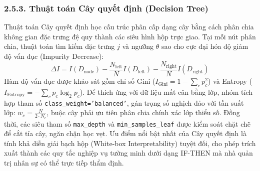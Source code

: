 \documentclass[12pt,a4paper]{article}
\begin{document}
\subsubsection{2.5.3. Thuật toán Cây quyết định (Decision Tree)}
Thuật toán Cây quyết định học cấu trúc phân cấp dạng cây bằng cách phân chia không gian đặc trưng đệ quy thành các siêu hình hộp trực giao. Tại mỗi nút phân chia, thuật toán tìm kiếm đặc trưng $j$ và ngưỡng $\theta$ sao cho cực đại hóa độ giảm độ vẩn đục (Impurity Decrease):
\begin{equation}
\Delta I = I(D_{\text{node}}) - \frac{N_{\text{left}}}{N} I(D_{\text{left}}) - \frac{N_{\text{right}}}{N} I(D_{\text{right}})
\end{equation}
Hàm độ vẩn đục được khảo sát gồm chỉ số Gini ($I_{\text{Gini}} = 1 - \sum_c p_c^2$) và Entropy ($I_{\text{Entropy}} = -\sum_c p_c \log_2 p_c$). Để thích ứng với dữ liệu mất cân bằng lớp, nhóm tích hợp tham số \texttt{class\_weight='balanced'}, gán trọng số nghịch đảo với tần suất lớp: $w_c = \frac{N}{2 \cdot N_c}$, buộc cây phải ưu tiên phân chia chính xác lớp thiểu số. Đồng thời, các siêu tham số \texttt{max\_depth} và \texttt{min\_samples\_leaf} được kiểm soát chặt chẽ để cắt tỉa cây, ngăn chặn học vẹt. Ưu điểm nổi bật nhất của Cây quyết định là tính khả diễn giải bạch hộp (White-box Interpretability) tuyệt đối, cho phép trích xuất thành các quy tắc nghiệp vụ tường minh dưới dạng IF-THEN mà nhà quản trị nhân sự có thể trực tiếp thẩm định.
\end{document}
